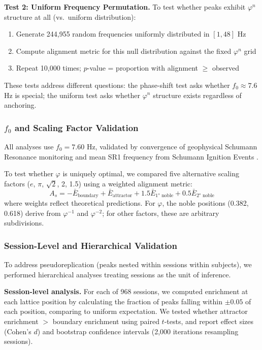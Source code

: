 \documentclass[11pt,a4paper]{article}
\newcommand{\phisym}{\varphi}
\newcommand{\fzero}{f_0}
\begin{document}
\textbf{Test 2: Uniform Frequency Permutation.} To test whether peaks exhibit $\phisym^n$ structure at all (vs.\ uniform distribution):
\begin{enumerate}
    \item Generate 244,955 random frequencies uniformly distributed in $[1, 48]$ Hz
    \item Compute alignment metric for this null distribution against the fixed $\phisym^n$ grid
    \item Repeat 10,000 times; $p$-value = proportion with alignment $\geq$ observed
\end{enumerate}

These tests address different questions: the phase-shift test asks whether $\fzero \approx 7.6$ Hz is special; the uniform test asks whether $\phisym^n$ structure exists regardless of anchoring.

\subsubsection{$\fzero$ and Scaling Factor Validation}

All analyses use $\fzero = 7.60$ Hz, validated by convergence of geophysical Schumann Resonance monitoring and mean SR1 frequency from Schumann Ignition Events \citep{lacy_sie}.

To test whether $\phisym$ is uniquely optimal, we compared five alternative scaling factors ($e$, $\pi$, $\sqrt{2}$, 2, 1.5) using a weighted alignment metric:
\begin{equation}
A_s = -\bar{E}_{\text{boundary}} + \bar{E}_{\text{attractor}} + 1.5\bar{E}_{\text{1° noble}} + 0.5\bar{E}_{\text{2° noble}}
\end{equation}
\noindent where weights reflect theoretical predictions. For $\phisym$, the noble positions (0.382, 0.618) derive from $\phisym^{-1}$ and $\phisym^{-2}$; for other factors, these are arbitrary subdivisions.

\subsubsection{Session-Level and Hierarchical Validation}
\label{sec:hierarchical_methods}

To address pseudoreplication (peaks nested within sessions within subjects), we performed hierarchical analyses treating sessions as the unit of inference.

\textbf{Session-level analysis.} For each of 968 sessions, we computed enrichment at each lattice position by calculating the fraction of peaks falling within $\pm 0.05$ of each position, comparing to uniform expectation. We tested whether attractor enrichment $>$ boundary enrichment using paired $t$-tests, and report effect sizes (Cohen's $d$) and bootstrap confidence intervals (2,000 iterations resampling sessions).
\end{document}
